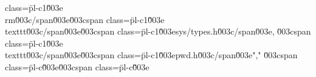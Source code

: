 class=\"pl-c1\"\u003e\\rm\u003c/span\u003e\u003cspan class=\"pl-c1\"\u003e\\texttt\u003c/span\u003e{\u003cspan class=\"pl-c1\"\u003esys/types.h\u003c/span\u003e}, \u003cspan class=\"pl-c1\"\u003e\\texttt\u003c/span\u003e{\u003cspan class=\"pl-c1\"\u003epwd.h\u003c/span\u003e}","        \u003cspan class=\"pl-c\"\u003e\u003cspan class=\"pl-c\"\u003e%